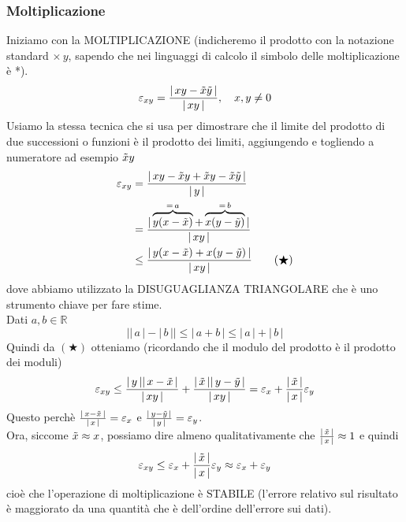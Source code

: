\documentclass[12pt]{article}
\begin{document}
\subsubsection{Moltiplicazione}
Iniziamo con la MOLTIPLICAZIONE (indicheremo il prodotto con la notazione standard $\times \, y$, sapendo che nei linguaggi di calcolo il simbolo delle moltiplicazione è *).
\[ \varepsilon_{xy} = \frac{\lvert \, xy - \Tilde{x}\Tilde{y} \, \rvert}{\lvert \, xy \, \rvert}, \quad x , y \ne 0 \]
Usiamo la stessa tecnica che si usa per dimostrare che il limite del prodotto di due successioni o funzioni è il prodotto dei limiti, aggiungendo e togliendo a numeratore ad esempio $\Tilde{x}y$
\[\begin{split}
    \varepsilon_{xy} & = \frac{\lvert \, xy - \Tilde{x}y + \Tilde{x}y - \Tilde{x}\Tilde{y} \, \rvert}{\lvert \, y \, \rvert} \\
    & = \frac{\lvert \, \overbrace{y(x - \Tilde{x})}^{=\,a} + \overbrace{x(y - \Tilde{y})}^{=\,b} \, \rvert}{\lvert\, xy \, \rvert} \\
    & \le \frac{\lvert \, y(x - \Tilde{x}) + x(y - \Tilde{y}) \, \rvert}{\lvert \, xy \, \rvert} \quad \quad (\bigstar) 
\end{split}\]
dove abbiamo utilizzato la DISUGUAGLIANZA TRIANGOLARE che è uno strumento chiave per fare stime.\\
Dati $a, b \in \mathbb{R}$
\[ \lvert \lvert \, a \, \rvert - \lvert \, b \, \rvert \rvert \le \lvert \, a + b \, \rvert \le \lvert \, a \, \rvert + \lvert \, b \, \rvert\] 
Quindi da $(\bigstar)$ otteniamo (ricordando che il modulo del prodotto è il prodotto dei moduli)
\[ \varepsilon_{xy} \le \frac{\lvert \,y\, \rvert \lvert \,x - \Tilde{x}\, \rvert}{\lvert \,xy\, \rvert} + \frac{\lvert \,\Tilde{x}\, \rvert \lvert \,y - \Tilde{y}\, \rvert}{\lvert \,xy\, \rvert} = \varepsilon_x + \frac{\lvert \,\Tilde{x}\, \rvert}{\lvert \,x\, \rvert} \varepsilon_y\]
Questo perchè $\frac{\lvert \,x - \Tilde{x}\, \rvert}{\lvert \,x\, \rvert} = \varepsilon_x$ e $\frac{\lvert \,y - \Tilde{y}\, \rvert}{\lvert \,y\, \rvert} = \varepsilon_y$.\\
Ora, siccome $\Tilde{x} \approx x$, possiamo dire almeno qualitativamente che $\frac{\lvert \,\Tilde{x}\, \rvert}{\lvert \,x\, \rvert} \approx 1$ e quindi 
\[ \varepsilon_{xy} \le \varepsilon_x + \frac{\lvert \,\Tilde{x}\, \rvert}{\lvert \,x\, \rvert} \varepsilon_y \approx \varepsilon_x + \varepsilon_y \]
cioè che l’operazione di moltiplicazione è STABILE (l’errore relativo sul risultato è maggiorato da una quantità che è dell'ordine dell'errore sui dati).\\
\end{document}
